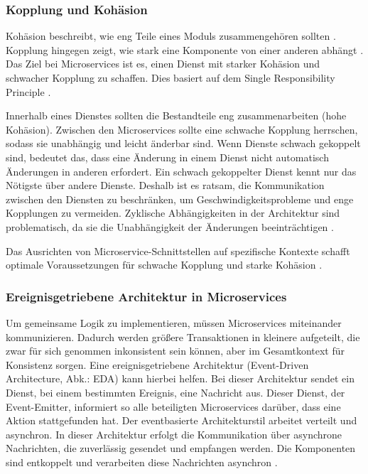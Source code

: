 {\subsubsection{Kopplung und Kohäsion}

Kohäsion beschreibt, wie eng Teile eines Moduls zusammengehören sollten \cite[S.40]{richards}. Kopplung hingegen zeigt, wie stark eine Komponente von einer anderen abhängt \cite[S.44]{richards}. Das Ziel bei Microservices ist es, einen Dienst mit starker Kohäsion und schwacher Kopplung zu schaffen. Dies basiert auf dem \glqq Single Responsibility Principle\grqq{} \cite[S.154-157]{sommerville}.

Innerhalb eines Dienstes sollten die Bestandteile eng zusammenarbeiten (hohe Kohäsion). Zwischen den Microservices sollte eine schwache Kopplung herrschen, sodass sie unabhängig und leicht änderbar sind. Wenn Dienste schwach gekoppelt sind, bedeutet das, dass eine Änderung in einem Dienst nicht automatisch Änderungen in anderen erfordert. Ein schwach gekoppelter Dienst kennt nur das Nötigste über andere Dienste. Deshalb ist es ratsam, die Kommunikation zwischen den Diensten zu beschränken, um Geschwindigkeitsprobleme und enge Kopplungen zu vermeiden. Zyklische Abhängigkeiten in der Architektur sind problematisch, da sie die Unabhängigkeit der Änderungen beeinträchtigen \cite[S. 101-105]{wolff} \cite[S.56]{newman}.

Das Ausrichten von Microservice-Schnittstellen auf spezifische Kontexte schafft optimale Voraussetzungen für schwache Kopplung und starke Kohäsion \cite[S.59,60]{newman}.

\subsubsection{Ereignisgetriebene Architektur in Microservices}

Um gemeinsame Logik zu implementieren, müssen Microservices miteinander kommunizieren. Dadurch werden größere Transaktionen in kleinere aufgeteilt, die zwar für sich genommen inkonsistent sein können, aber im Gesamtkontext für Konsistenz sorgen. Eine ereignisgetriebene Architektur (Event-Driven Architecture, Abk.: EDA) kann hierbei helfen. Bei dieser Architektur sendet ein Dienst, bei einem bestimmten Ereignis, eine Nachricht aus. Dieser Dienst, der \glqq Event-Emitter\grqq, informiert so alle beteiligten Microservices darüber, dass eine Aktion stattgefunden hat. Der eventbasierte Architekturstil arbeitet verteilt und asynchron. In dieser Architektur erfolgt die Kommunikation über asynchrone Nachrichten, die zuverlässig gesendet und empfangen werden. Die Komponenten sind entkoppelt und verarbeiten diese Nachrichten asynchron \cite[S. 137 - 138]{wolff} \cite[S.183]{richards} \cite[S.301]{daschner}.

}
